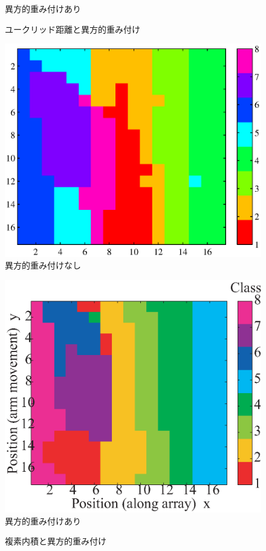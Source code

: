 ﻿\documentclass[a4j, 10pt]{jarticle}
\begin{document}
\begin{figure}[btp]
\begin{center}
\begin{minipage}{0.4\hsize}
\centering\textmd{異方的重み付けあり}
   \end{minipage}
\caption{ユークリッド距離と異方的重み付け}
\label{aniso-e}
 \end{center}
 \begin{center}
   \begin{minipage}{0.4\hsize}
\includegraphics[width =\hsize ]{SOM_mine6_02005_i_raw.eps}
\centering\textmd{異方的重み付けなし}
   \end{minipage}
   \begin{minipage}{0.4\hsize}
\includegraphics[width =\hsize ]{SOM_mine6_02005_i_wsqrt.eps}
\centering\textmd{異方的重み付けあり}
   \end{minipage}
\caption{複素内積と異方的重み付け}
\label{aniso-i}
 \end{center}
\end{figure}
\end{document}
